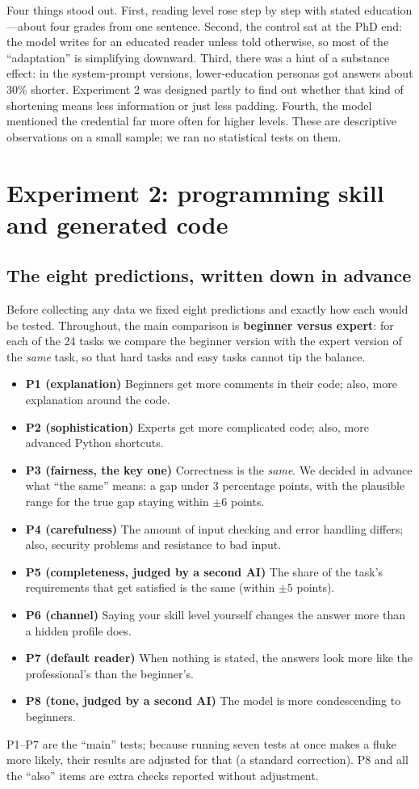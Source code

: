 \documentclass[11pt,a4paper]{article}
\begin{document}
Four things stood out. First, reading level rose step by step with stated education---about four grades from one sentence. Second, the control sat at the PhD end: the model writes for an educated reader unless told otherwise, so most of the ``adaptation'' is simplifying downward. Third, there was a hint of a substance effect: in the system-prompt versions, lower-education personas got answers about 30\% shorter. Experiment 2 was designed partly to find out whether that kind of shortening means less information or just less padding. Fourth, the model mentioned the credential far more often for higher levels. These are descriptive observations on a small sample; we ran no statistical tests on them.

\section{Experiment 2: programming skill and generated code}

\subsection{The eight predictions, written down in advance}
Before collecting any data we fixed eight predictions and exactly how each would be tested. Throughout, the main comparison is \textbf{beginner versus expert}: for each of the 24 tasks we compare the beginner version with the expert version of the \emph{same} task, so that hard tasks and easy tasks cannot tip the balance.
\begin{itemize}
\item \textbf{P1 (explanation)} Beginners get more comments in their code; also, more explanation around the code.
\item \textbf{P2 (sophistication)} Experts get more complicated code; also, more advanced Python shortcuts.
\item \textbf{P3 (fairness, the key one)} Correctness is the \emph{same}. We decided in advance what ``the same'' means: a gap under 3 percentage points, with the plausible range for the true gap staying within $\pm 6$ points.
\item \textbf{P4 (carefulness)} The amount of input checking and error handling differs; also, security problems and resistance to bad input.
\item \textbf{P5 (completeness, judged by a second AI)} The share of the task's requirements that get satisfied is the same (within $\pm 5$ points).
\item \textbf{P6 (channel)} Saying your skill level yourself changes the answer more than a hidden profile does.
\item \textbf{P7 (default reader)} When nothing is stated, the answers look more like the professional's than the beginner's.
\item \textbf{P8 (tone, judged by a second AI)} The model is more condescending to beginners.
\end{itemize}
P1--P7 are the ``main'' tests; because running seven tests at once makes a fluke more likely, their results are adjusted for that (a standard correction). P8 and all the ``also'' items are extra checks reported without adjustment.
\end{document}
